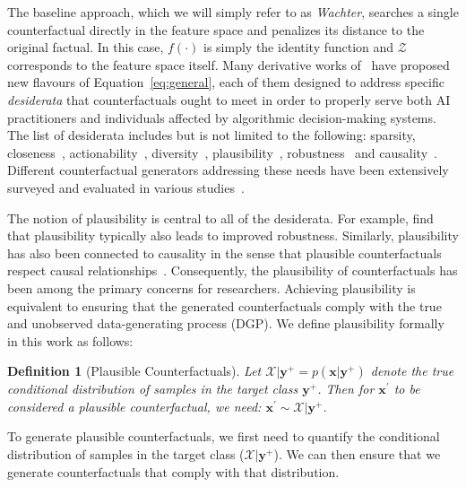 \documentclass[letterpaper]{article} %
\newtheorem{definition}{Definition}[section]
\begin{document}
The baseline approach, which we will simply refer to as \textit{Wachter}, searches a single counterfactual directly in the feature space and penalizes its distance to the original factual. In this case, $f(\cdot)$ is simply the identity function and $\mathcal{Z}$ corresponds to the feature space itself. Many derivative works of~\citet{wachter2017counterfactual} have proposed new flavours of Equation~\ref{eq:general}, each of them designed to address specific \textit{desiderata} that counterfactuals ought to meet in order to properly serve both AI practitioners and individuals affected by algorithmic decision-making systems. The list of desiderata includes but is not limited to the following: sparsity, closeness~\citep{wachter2017counterfactual}, actionability~\citep{ustun2019actionable}, diversity~\citep{mothilal2020explaining}, plausibility~\citep{joshi2019realistic,poyiadzi2020face,schut2021generating}, robustness~\citep{upadhyay2021robust,pawelczyk2022probabilistically,altmeyer2023endogenous} and causality~\citep{karimi2021algorithmic}. Different counterfactual generators addressing these needs have been extensively surveyed and evaluated in various studies~\citep{verma2020counterfactual,karimi2020survey,pawelczyk2021carla,artelt2021evaluating,guidotti2022counterfactual}. 

The notion of plausibility is central to all of the desiderata. For example, \citet{artelt2021evaluating} find that plausibility typically also leads to improved robustness. Similarly, plausibility has also been connected to causality in the sense that plausible counterfactuals respect causal relationships~\citep{mahajan2019preserving}. Consequently, the plausibility of counterfactuals has been among the primary concerns for researchers. Achieving plausibility is equivalent to ensuring that the generated counterfactuals comply with the true and unobserved data-generating process (DGP). We define plausibility formally in this work as follows:

\begin{definition}[Plausible Counterfactuals]
  \label{def:plausible}
  Let $\mathcal{X}|\mathbf{y}^+= p(\mathbf{x}|\mathbf{y}^+)$ denote the true conditional distribution of samples in the target class $\mathbf{y}^+$. Then for $\mathbf{x}^{\prime}$ to be considered a plausible counterfactual, we need: $\mathbf{x}^{\prime} \sim \mathcal{X}|\mathbf{y}^+$.
\end{definition}

To generate plausible counterfactuals, we first need to quantify the conditional distribution of samples in the target class ($\mathcal{X}|\mathbf{y}^+$). We can then ensure that we generate counterfactuals that comply with that distribution.
\end{document}
